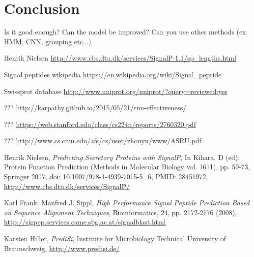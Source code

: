 
\section{Conclusion}

Is it good enough? Can the model be improved? Can you use other methods (ex HMM, CNN, grouping etc...)


\newpage

\begin{thebibliography}{9}

 Henrik Nielsen
\url{http://www.cbs.dtu.dk/services/SignalP-1.1/sp_lengths.html}

 Signal peptides wikipedia
\url{https://en.wikipedia.org/wiki/Signal_peptide}

 Swissprot database
\url{http://www.uniprot.org/uniprot/?query=reviewed:yes}

 ???
\url{http://karpathy.github.io/2015/05/21/rnn-effectiveness/}

 ???
\url{https://web.stanford.edu/class/cs224n/reports/2760320.pdf}

 ???
\url{http://www.cs.cmu.edu/afs/cs/user/zhouyu/www/ASRU.pdf}

 Henrik Nielsen,
 {\em Predicting Secretory Proteins with SignalP},
 In Kihara, D (ed): Protein Function Prediction (Methods in Molecular Biology vol. 1611),  pp. 59-73, Springer 2017, doi: 10.1007/978-1-4939-7015-5\_6, PMID: 28451972, 
\url{http://www.cbs.dtu.dk/services/SignalP/}  %

 Karl Frank; Manfred J. Sippl,
{\em High Performance Signal Peptide Prediction Based on Sequence Alignment Techniques},
Bioinformatics, 24, pp. 2172-2176 (2008), \url{http://sigpep.services.came.sbg.ac.at/signalblast.html}

  Karsten Hiller,
{\em PrediSi}, Institute for Microbiology Technical University of Braunschweig, 
\url{http://www.predisi.de/}

\end{thebibliography}

